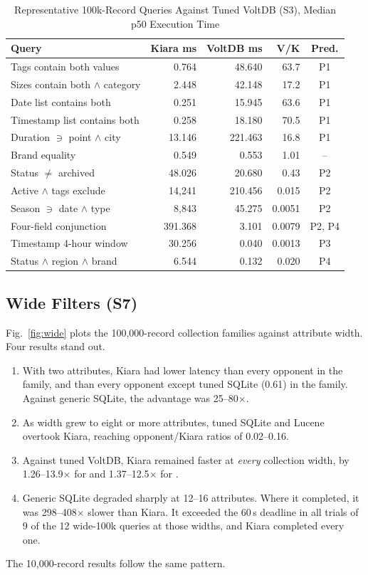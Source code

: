 \begin{table}[t]
\centering
\caption{Representative 100k-Record Queries Against Tuned VoltDB (S3), Median p50 Execution Time}
\label{tab:anatomy}
\setlength{\tabcolsep}{1.8pt}
\begin{tabular}{@{}lrrrc@{}}
\toprule
Query & Kiara ms & VoltDB ms & V/K & Pred. \\
\midrule
Tags contain both values & 0.764 & 48.640 & 63.7 & P1 \\
Sizes contain both $\wedge$ category & 2.448 & 42.148 & 17.2 & P1 \\
Date list contains both & 0.251 & 15.945 & 63.6 & P1 \\
Timestamp list contains both & 0.258 & 18.180 & 70.5 & P1 \\
Duration $\ni$ point $\wedge$ city & 13.146 & 221.463 & 16.8 & P1 \\
Brand equality & 0.549 & 0.553 & 1.01 & -- \\
Status $\ne$ archived & 48.026 & 20.680 & 0.43 & P2 \\
Active $\wedge$ tags exclude & 14{,}241 & 210.456 & 0.015 & P2 \\
Season $\ni$ date $\wedge$ type & 8{,}843 & 45.275 & 0.0051 & P2 \\
Four-field conjunction & 391.368 & 3.101 & 0.0079 & P2, P4 \\
Timestamp 4-hour window & 30.256 & 0.040 & 0.0013 & P3 \\
Status $\wedge$ region $\wedge$ brand & 6.544 & 0.132 & 0.020 & P4 \\
\bottomrule
\end{tabular}
\end{table}

\subsection{Wide Filters (S7)}
Fig.~\ref{fig:wide} plots the 100,000-record collection families against attribute width. Four results stand out.
\begin{enumerate}
\item With two attributes, Kiara had lower latency than every opponent in the  family, and than every opponent except tuned SQLite (0.61) in the  family. Against generic SQLite, the advantage was 25--80$\times$.
\item As width grew to eight or more attributes, tuned SQLite and Lucene overtook Kiara, reaching opponent/Kiara ratios of 0.02--0.16.
\item Against tuned VoltDB, Kiara remained faster at \emph{every} collection width, by 1.26--13.9$\times$ for  and 1.37--12.5$\times$ for .
\item Generic SQLite degraded sharply at 12--16 attributes. Where it completed, it was 298--408$\times$ slower than Kiara. It exceeded the 60\,s deadline in all trials of 9 of the 12 wide-100k queries at those widths, and Kiara completed every one.
\end{enumerate}
The 10,000-record results follow the same pattern.

